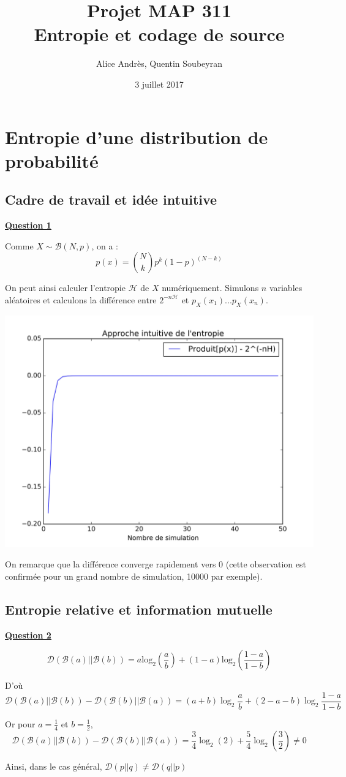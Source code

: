 \documentclass[a4paper,twoside,10pt]{article}
\title{Projet MAP 311 \\ Entropie et codage de source}
\author{Alice Andrès, Quentin Soubeyran}
\date{3 juillet 2017}
\renewcommand{\H}{\mathcal{H}}
\newcommand{\B}{\mathcal{B}}
\newcommand{\D}{\mathcal{D}}
\newenvironment{Q}[1]{%
\vspace{1ex}
\underline{\textbf{Question #1\\}}
\newline
}{
\vspace{2ex}
}
\begin{document}
\maketitle
\newpage

\section{Entropie d'une distribution de probabilité}

\subsection{Cadre de travail et idée intuitive}
\begin{Q}{1}
Comme $X \sim \B(N,p)$, on a :
\[
p(x) = {N \choose k} p^k (1-p)^{(N-k)}
\]

On peut ainsi calculer l'entropie $\H$ de $X$ numériquement. Simulons $n$ variables aléatoires et calculons la différence entre $2^{-n\H}$ et $p_X(x_1)...p_X(x_n)$.

\begin{center}
\includegraphics[width=\textwidth]{Q1.jpg}
\end{center}

On remarque que la différence converge rapidement vers 0 (cette observation est confirmée pour un grand nombre de simulation, 10000 par exemple).


\end{Q}
\subsection{Entropie relative et information mutuelle}
\begin{Q}{2}
\[
\D(\B(a)||\B(b))
= a \operatorname{log_2}(\frac{a}{b}) + (1-a) \operatorname{log_2}(\frac{1-a}{1-b})
\]

D'où
\[\D(\B(a)||\B(b))  - \D(\B(b)||\B(a)) 
= (a+b)\log_2{\frac{a}{b}} + (2-a-b)\log_2{\frac{1-a}{1-b}}
\]

Or pour $a = \frac{1}{4}$ et $b = \frac{1}{2}$, 
\[
\D(\B(a)||\B(b))  - \D(\B(b)||\B(a))
= \frac{3}{4} \log_2{(2)} + \frac{5}{4} \log_2{(\frac{3}{2})} \neq 0
\]


Ainsi, dans le cas général, $ \D (p||q) \neq \D(q||p)$
\end{Q}
\end{document}
